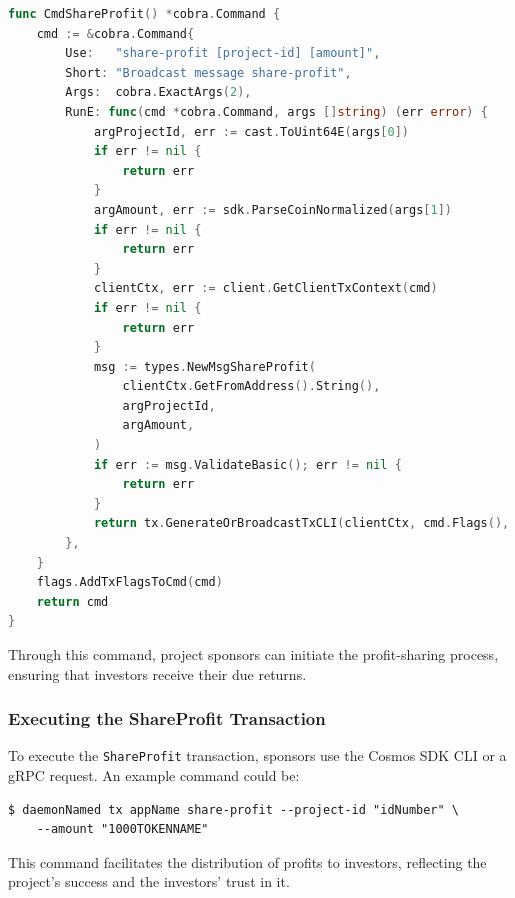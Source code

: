 \newpage
\begin{lstlisting}[language=go, caption=Share Profit CLI Definition, label={lst:share-profit-cli}]
func CmdShareProfit() *cobra.Command {
	cmd := &cobra.Command{
		Use:   "share-profit [project-id] [amount]",
		Short: "Broadcast message share-profit",
		Args:  cobra.ExactArgs(2),
		RunE: func(cmd *cobra.Command, args []string) (err error) {
			argProjectId, err := cast.ToUint64E(args[0])
			if err != nil {
				return err
			}
			argAmount, err := sdk.ParseCoinNormalized(args[1])
			if err != nil {
				return err
			}
			clientCtx, err := client.GetClientTxContext(cmd)
			if err != nil {
				return err
			}
			msg := types.NewMsgShareProfit(
				clientCtx.GetFromAddress().String(),
				argProjectId,
				argAmount,
			)
			if err := msg.ValidateBasic(); err != nil {
				return err
			}
			return tx.GenerateOrBroadcastTxCLI(clientCtx, cmd.Flags(), msg)
		},
	}
	flags.AddTxFlagsToCmd(cmd)
	return cmd
}
\end{lstlisting}

Through this command, project sponsors can initiate the profit-sharing process, ensuring that investors receive their due returns.

\subsubsection{Executing the ShareProfit Transaction}
\label{subsubsec:executing-share-profit}

To execute the \texttt{ShareProfit} transaction, sponsors use the Cosmos SDK CLI or a gRPC request. An example command could be:

\begin{verbatim}
$ daemonNamed tx appName share-profit --project-id "idNumber" \
    --amount "1000TOKENNAME"
\end{verbatim}

This command facilitates the distribution of profits to investors, reflecting the project's success and the investors' trust in it.

